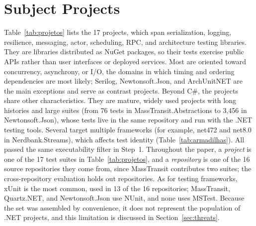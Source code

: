 \section{Subject Projects}
\label{sec:subjects}
Table~\ref{tab:projetos} lists the 17 projects, which span serialization, logging, resilience, messaging, actor, scheduling, RPC, and architecture testing libraries. They are libraries distributed as NuGet packages, so their tests exercise public APIs rather than user interfaces or deployed services. Most are oriented toward concurrency, asynchrony, or I/O, the domains in which timing and ordering dependencies are most likely; Serilog, Newtonsoft.Json, and ArchUnitNET are the main exceptions and serve as contrast projects. Beyond C\#, the projects share other characteristics. They are mature, widely used projects with long histories and large suites (from 76 tests in MassTransit.Abstractions to 3,456 in Newtonsoft.Json), whose tests live in the same repository and run with the .NET testing tools. Several target multiple frameworks (for example, net472 and net8.0 in Nerdbank.Streams), which affects test identity (Table~\ref{tab:armadilhas}). All passed the same executability filter in Step~1. Throughout the paper, a \emph{project} is one of the 17 test suites in Table~\ref{tab:projetos}, and a \emph{repository} is one of the 16 source repositories they come from, since MassTransit contributes two suites; the cross-repository evaluation holds out repositories. As for testing frameworks, xUnit is the most common, used in 13 of the 16 repositories; MassTransit, Quartz.NET, and Newtonsoft.Json use NUnit, and none uses MSTest. Because the set was assembled by convenience, it does not represent the population of .NET projects, and this limitation is discussed in Section~\ref{sec:threats}.

